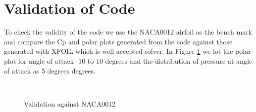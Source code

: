 \documentclass[main.tex]{subfiles}
\begin{document}
\section{Validation of Code}
To check the validity of the code we use the NACA0012 airfoil as the bench mark and compare the Cp and polar plots generated from the code against those generated with XFOIL which is well accepted solver. In Figure \ref{fig4}  we lot the polar plot for angle of attack -10 to 10 degrees and the distribution of pressure at angle of attack as 5 degrees
degrees.



\begin{figure}[h!]
    \centering
    \vspace{-1em}
    \\
    \caption{Validation against NACA0012}
    \label{fig4}
\end{figure}

\newpage
\end{document}

